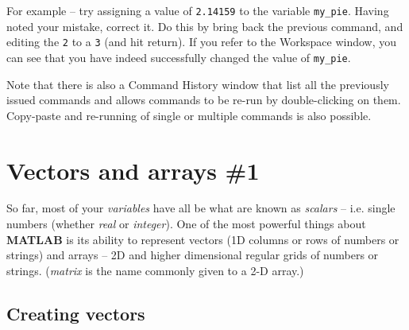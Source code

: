 \documentclass{tufte-book} %
\begin{document}
For example -- try assigning a value of \texttt{2.14159} to the variable \texttt{my\_pie}. Having noted your mistake, correct it. Do this by bring back the previous command, and editing the \texttt{2} to a \texttt{3} (and hit return). If you refer to the \textsf{Workspace} window, you can see that you have indeed successfully changed the value of \texttt{my\_pie}.

Note that there is also a \textsf{Command History} window that list all the previously issued commands and allows commands to be re-run by double-clicking on them. Copy-paste and re-running of single or multiple commands is also possible.


\newpage


\section{Vectors and arrays \#1}

So far, most of your \textit{variables} have all be what are known as \textit{scalars} -- i.e. single numbers (whether \textit{real} or \textit{integer}).
One of the most powerful things about \textbf{MATLAB} is its ability to represent vectors (1D columns or rows of numbers or strings) and arrays -- 2D and higher dimensional regular grids of numbers or strings. (\textit{matrix} is the name commonly given to a 2-D array.)
 

\subsection{Creating vectors}
\end{document}

